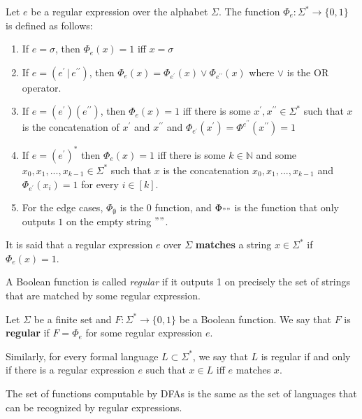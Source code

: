 \documentclass{article}
\begin{document}
  \begin{definition}
  Let $e$ be a regular expression over the alphabet $\Sigma$. The function $\Phi_e : \Sigma^* \longrightarrow \{0,1\}$ is defined as follows: 
  \begin{enumerate}
      \item If $e = \sigma$, then $\Phi_e (x) = 1$ iff $x = \sigma$ 
      \item If $e = (e^\prime \,|\, e^{\prime\prime})$, then $\Phi_e (x) = \Phi_{e^\prime} (x) \vee \Phi_{e^{\prime\prime}} (x)$ where $\vee$ is the OR operator. 
      \item If $e = (e^\prime) (e^{\prime\prime})$, then $\Phi_e (x) = 1$ iff there is some $x^\prime, x^{\prime\prime} \in \Sigma^*$ such that $x$ is the concatenation of $x^\prime$ and $x^{\prime\prime}$ and $\Phi_{e^\prime} (x^\prime) = \Phi^{e^{\prime\prime}} (x^{\prime\prime}) = 1$ 
      \item If $e = (e^\prime)^*$ then $\Phi_e (x) = 1$ iff there is some $k \in \mathbb{N}$ and some $x_0, x_1, ..., x_{k-1} \in \Sigma^*$ such that $x$ is the concatenation $x_0, x_1, ..., x_{k-1}$ and $\Phi_{e^\prime} (x_i) = 1$ for every $i \in [k]$. 
      \item For the edge cases, $\Phi_{\emptyset}$ is the $0$ function, and $\Phi_{""}$ is the function that only outputs $1$ on the empty string $""$. 
  \end{enumerate}
  It is said that a regular expression $e$ over $\Sigma$ \textbf{matches} a string $x \in \Sigma^*$ if $\Phi_e (x) = 1$. 
  \end{definition}

  A Boolean function is called \textit{regular} if it outputs 1 on precisely the set of strings that are matched by some regular expression. 

  \begin{definition}
  Let $\Sigma$ be a finite set and $F: \Sigma^* \longrightarrow \{0,1\}$ be a Boolean function. We say that $F$ is \textbf{regular} if $F = \Phi_e$ for some regular expression $e$. 

  Similarly, for every formal language $L \subset \Sigma^*$, we say that $L$ is regular if and only if there is a regular expression $e$ such that $x \in L$ iff $e$ matches $x$. 
  \end{definition}

  \begin{definition}
  The set of functions computable by DFAs is the same as the set of languages that can be recognized by regular expressions. 
  \end{definition}
\end{document}
